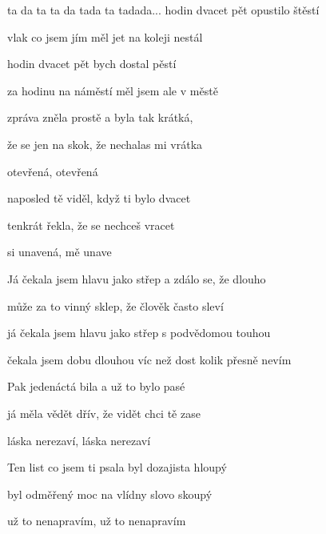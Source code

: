

\zr
{} ta da ta ta da tada ta tadada...       
\kr
\zs
{} hodin dvacet pět  opustilo štěstí

 vlak co jsem jím měl jet na koleji  nestál

 hodin dvacet pět  bych dostal pěstí

 za hodinu na náměstí měl jsem 
ale v  městě


 zpráva zněla prostě a byla tak krátká,

že  se jen na skok, že nechalas mi vrátka

 otevřená,  otevřená 



 naposled tě viděl, když ti bylo dvacet

 tenkrát řekla, že se nechceš vracet

 si unavená,  mě unave
\ks

\zr \kr

\zs
Já čekala jsem hlavu jako střep a zdálo se, že dlouho

může za to vinný sklep, že člověk často sleví

já čekala jsem hlavu jako střep s podvědomou touhou

čekala jsem dobu dlouhou víc než dost kolik přesně nevím



Pak jedenáctá bila a už to bylo pasé

já měla vědět dřív, že vidět chci tě zase

láska nerezaví, láska nerezaví



Ten list co jsem ti psala byl dozajista hloupý

byl odměřený moc na vlídny slovo skoupý

už to nenapravím, už to nenapravím
\ks
\zr \kr
\kp






















